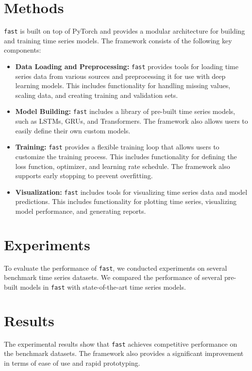 \documentclass[twoside,11pt]{article}
\begin{document}
\section{Methods}

\texttt{fast} is built on top of PyTorch and provides a modular architecture for building and training time series models. The framework consists of the following key components:

\begin{itemize}
    \item \textbf{Data Loading and Preprocessing:} \texttt{fast} provides tools for loading time series data from various sources and preprocessing it for use with deep learning models. This includes functionality for handling missing values, scaling data, and creating training and validation sets.
    \item \textbf{Model Building:} \texttt{fast} includes a library of pre-built time series models, such as LSTMs, GRUs, and Transformers. The framework also allows users to easily define their own custom models.
    \item \textbf{Training:} \texttt{fast} provides a flexible training loop that allows users to customize the training process. This includes functionality for defining the loss function, optimizer, and learning rate schedule. The framework also supports early stopping to prevent overfitting.
    \item \textbf{Visualization:} \texttt{fast} includes tools for visualizing time series data and model predictions. This includes functionality for plotting time series, visualizing model performance, and generating reports.
\end{itemize}

\section{Experiments}

To evaluate the performance of \texttt{fast}, we conducted experiments on several benchmark time series datasets. We compared the performance of several pre-built models in \texttt{fast} with state-of-the-art time series models.

\section{Results}

The experimental results show that \texttt{fast} achieves competitive performance on the benchmark datasets. The framework also provides a significant improvement in terms of ease of use and rapid prototyping.
\end{document}
